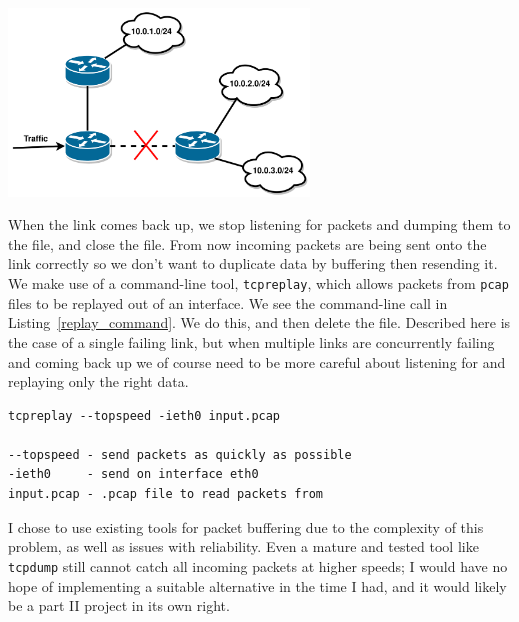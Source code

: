 \documentclass[withindex,glossary,openany]{cam-thesis}
\begin{document}
\begin{center}
\begin{minipage}{0.9\textwidth} \centering
	\includegraphics[width=0.6\textwidth]{ip_route}
	\label{fig:ip_route}
\end{minipage}
\end{center}

When the link comes back up, we stop listening for packets and dumping them to the file, and close the file. From now incoming packets are being sent onto the link correctly so we don't want to duplicate data by buffering then resending it. We make use of a command-line tool, \texttt{tcpreplay}, which allows packets from \texttt{pcap} files to be replayed out of  an interface. We see the command-line call in Listing~\ref{replay_command}. We do this, and then delete the file. Described here is the case of a single failing link, but when multiple links are concurrently failing and coming back up we of course need to be more careful about listening for and replaying only the right data.

\begin{lstlisting}[label=replay_command, caption=\texttt{tcpreplay} command with explanation of arguments, frame=tb]
tcpreplay --topspeed -ieth0 input.pcap

--topspeed - send packets as quickly as possible
-ieth0     - send on interface eth0
input.pcap - .pcap file to read packets from
\end{lstlisting}

I chose to use existing tools for packet buffering due to the complexity of this problem, as well as issues with reliability. Even a mature and tested tool like \texttt{tcpdump} still cannot catch all incoming packets at higher speeds; I would have no hope of implementing a suitable alternative in the time I had, and it would likely be a part II project in its own right.
\end{document}
